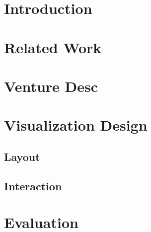 \documentclass{sigchi}
\begin{document}


\section{Introduction}


\section{Related Work}

\section{Venture Desc}

\section{Visualization Design}

\subsection{Layout}

\subsection{Interaction}


\section{Evaluation}
\end{document}
